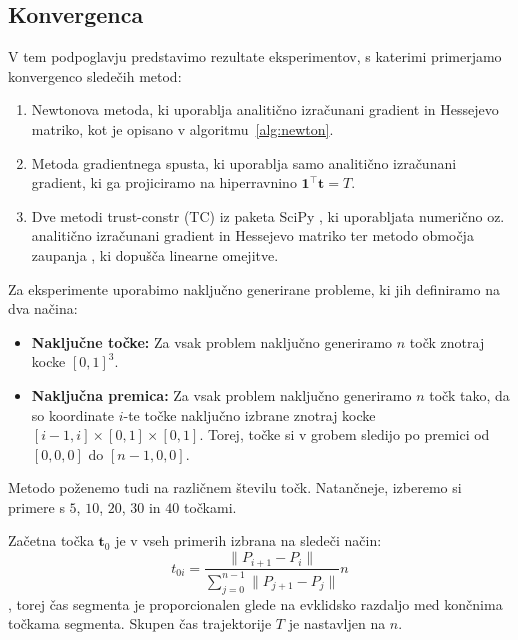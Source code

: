 \documentclass[isrm2, tisk]{fmfdelo}
\newcommand{\tvec}{\mathbf{t}}
\begin{document}
\subsection{Konvergenca}
\label{sec:convergence}

V tem podpoglavju predstavimo rezultate eksperimentov, s katerimi primerjamo konvergenco sledečih metod:
\begin{enumerate}
    \item Newtonova metoda, ki uporablja analitično izračunani gradient in Hessejevo matriko, kot je opisano v algoritmu~\ref{alg:newton}.
    \item Metoda gradientnega spusta, ki uporablja samo analitično izračunani gradient, ki ga projiciramo na hiperravnino $\mathbf{1}^\top \mathbf{t} = T$.
    \item Dve metodi trust-constr (TC) iz paketa SciPy \cite{2020SciPy-NMeth}, ki uporabljata numerično oz. analitično izračunani gradient in Hessejevo matriko ter metodo območja zaupanja \cite{conn2000trust}, ki dopušča linearne omejitve.
\end{enumerate}

Za eksperimente uporabimo naključno generirane probleme, ki jih definiramo na dva načina:
\begin{itemize}
    \item \textbf{Naključne točke:} Za vsak problem naključno generiramo $n$ točk znotraj kocke $[0, 1]^3$.
    \item \textbf{Naključna premica:} Za vsak problem naključno generiramo $n$ točk tako, da so koordinate $i$-te točke naključno izbrane znotraj kocke $[i-1, i]\times[0, 1]\times[0, 1]$. Torej, točke si v grobem sledijo po premici od $[0, 0, 0]$ do $[n-1, 0, 0]$.
\end{itemize}
    
Metodo poženemo tudi na različnem številu točk. Natančneje, izberemo si primere s $5$, $10$, $20$, $30$ in $40$ točkami.

Začetna točka $\tvec_0$ je v vseh primerih izbrana na sledeči način:
\begin{equation}
    t_{0i} = \frac{\|P_{i+1} - P_i\|}{\sum_{j=0}^{n-1} \|P_{j+1} - P_j\|} n
\end{equation},
torej čas segmenta je proporcionalen glede na evklidsko razdaljo med končnima točkama segmenta. Skupen čas trajektorije $T$ je nastavljen na $n$.
\end{document}
